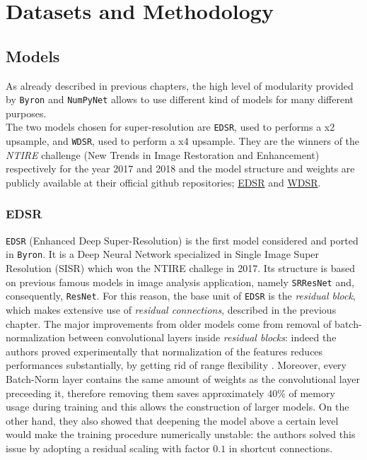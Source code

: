 \documentclass[12pt,a4paper]{report}
\begin{document}
\chapter{Datasets and Methodology}

\section{Models}

As already described in previous chapters, the high level of modularity provided by \texttt{Byron} and \texttt{NumPyNet} allows to use different kind of models for many different purposes. \\ The two models chosen for super-resolution are {\tt EDSR}, used to performs a x2 upsample, and {\tt WDSR}, used to perform a x4 upsample. 
They are the winners of the {\it NTIRE} challenge (New Trends in Image Restoration and Enhancement) respectively for the year 2017 and 2018 and the model structure and weights are publicly available at their official github repositories; \href{https://github.com/thstkdgus35/EDSR-PyTorch}{EDSR} and \href{https://github.com/JiahuiYu/wdsr_ntire2018}{WDSR}.

\subsection*{EDSR}

{\tt EDSR} (Enhanced Deep Super-Resolution) \cite{edsr} is the first model considered and ported in {\tt Byron}. 
It is a Deep Neural Network specialized in Single Image Super Resolution (SISR) which won the NTIRE challege in 2017.
Its structure is based on previous famous models in image analysis application, namely {\tt SRResNet} and, consequently, {\tt ResNet}. 
For this reason, the base unit of {\tt EDSR} is the {\it residual block}, which makes extensive use of {\it residual connections}, described in the previous chapter.
The major improvements from older models come from removal of batch-normalization between convolutional layers inside {\it residual blocks}: indeed the authors proved experimentally that normalization of the features reduces performances substantially, by getting rid of range flexibility \cite{edsr}. 
Moreover, every Batch-Norm layer contains the same amount of weights as the convolutional layer preceeding it, therefore removing them saves approximately 40\% of memory usage during training and this allows the construction of larger models.
On the other hand, they also showed that deepening the model above a certain level would make the training procedure numerically unstable: the authors solved this issue by adopting a residual scaling with factor $0.1$ in shortcut connections. 
 
\end{document}
